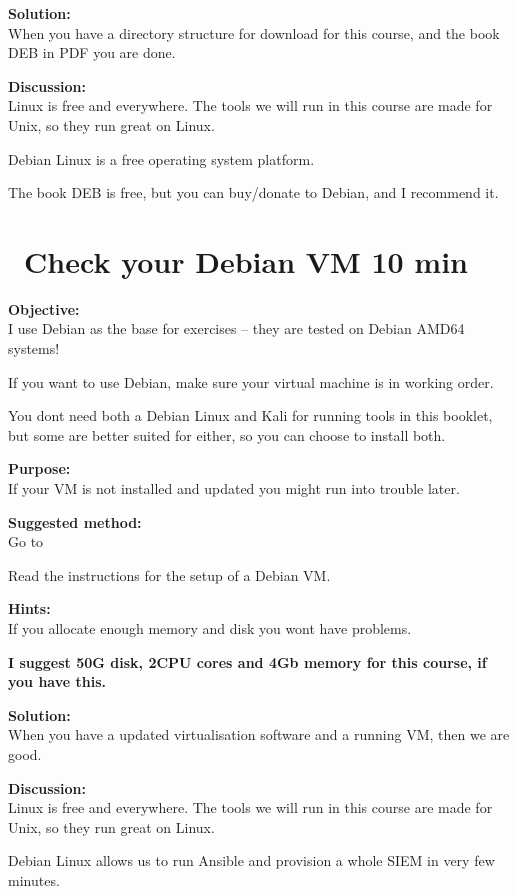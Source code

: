 \documentclass[a4paper,11pt,notitlepage]{report}
\begin{document}
{\bf Solution:}\\
When you have a directory structure for download for this course, and the book DEB in PDF you are done.

{\bf Discussion:}\\
Linux is free and everywhere. The tools we will run in this course are made for Unix, so they run great on Linux.

Debian Linux is a free operating system platform.

The book DEB is free, but you can buy/donate to Debian, and I recommend it.


\chapter{\faInfoCircle\ Check your Debian VM 10 min}
\label{ex:sw-basicDebianVM}


{\bf Objective:}\\
I use Debian as the base for exercises -- they are tested on Debian AMD64 systems!

If you want to use Debian, make sure your virtual machine is in working order.

You dont need both a Debian Linux and Kali for running tools in this booklet, but some are better suited for either, so you can choose to install both.

{\bf Purpose:}\\
If your VM is not installed and updated you might run into trouble later.

{\bf Suggested method:}\\
Go to 

Read the instructions for the setup of a Debian VM.


{\bf Hints:}\\
If you allocate enough memory and disk you wont have problems.

{\bf I suggest 50G disk, 2CPU cores and 4Gb memory for this course, if you have this.}

{\bf Solution:}\\
When you have a updated virtualisation software and a running VM, then we are good.

{\bf Discussion:}\\
Linux is free and everywhere. The tools we will run in this course are made for Unix, so they run great on Linux.

Debian Linux allows us to run Ansible and provision a whole SIEM in very few minutes.
\end{document}
